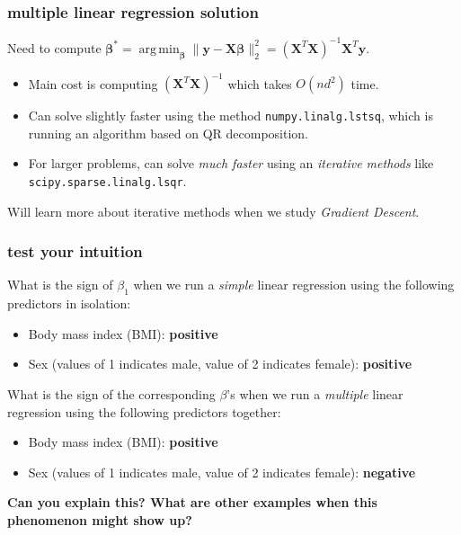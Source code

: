 \documentclass[handout,compress]{beamer}
\newcommand{\bs}[1]{\boldsymbol{#1}}
\newcommand{\bv}[1]{\mathbf{#1}}
\DeclareMathOperator*{\argmin}{arg\,min}
\begin{document}
\begin{frame}[t]
	\frametitle{multiple linear regression solution}
	Need to compute $\bs{\beta}^* = \argmin_{\bs{\beta}}\|\bv{y} - \bv{X}\bs{\beta}\|_2^2 = \left(\bv{X}^T\bv{X}\right)^{-1}\bv{X}^T\bv{y}$.
	\begin{itemize}
		\item Main cost is computing $(\bv{X}^T\bv{X})^{-1}$ which takes $O(nd^2)$ time. 
		\item Can solve slightly faster using the method \texttt{numpy.linalg.lstsq}, which is running an algorithm based on QR decomposition. 
		\item For larger problems, can solve \emph{much faster} using an \textit{iterative methods} like \texttt{scipy.sparse.linalg.lsqr}.
	\end{itemize}

\begin{center}
	Will learn more about iterative methods when we study \emph{Gradient Descent}.
\end{center}
\end{frame}

\begin{frame}
	\frametitle{test your intuition}
	What is the sign of $\beta_1$ when we run a \emph{simple} linear regression using the following predictors in isolation:
	\begin{itemize}
		\item Body mass index (BMI): \textbf{positive}
		\item Sex (values of 1 indicates male, value of 2 indicates female): \textbf{positive}
	\end{itemize}

	What is the sign of the corresponding $\beta$'s when we run a \emph{multiple} linear regression using the following predictors together:
	\begin{itemize}
	\item Body mass index (BMI): \textbf{positive}
	\item Sex (values of 1 indicates male, value of 2 indicates female): \textbf{negative}
	\end{itemize}
	\begin{center}
		\alert{\textbf{Can you explain this? What are other examples when this phenomenon might show up?}}
	\end{center}
\end{frame}
\end{document}
